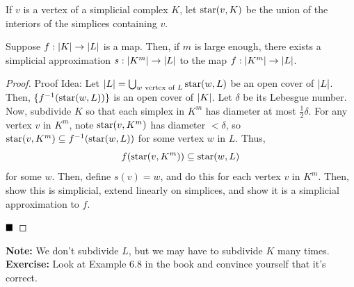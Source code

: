 \begin{definition}
    If $v$ is a vertex of a simplicial complex $K$, let $\tt{star}(v, K)$ be the union of the interiors of the simplices containing $v$.
\end{definition}

\begin{theorem}
    Suppose $f : \abs{K} \to \abs{L}$ is a map. Then, if $m$ is large enough, there exists a simplicial approximation $s : \abs{K^{m}} \to \abs{L}$ to the map $f : \abs{K^{m}} \to \abs{L}$.
\end{theorem}
\begin{proof}{Proof Idea:}
    Let $\abs{L} = \bigcup_{w \tt{ vertex of } L} \tt{star}(w, L)$ be an open cover of $\abs{L}$. Then, $\{f^{-1}(\tt{star}(w, L))\}$ is an open cover of $\abs{K}$. Let $\delta$ be its Lebesgue number.\\

    Now, subdivide $K$ so that each simplex in $K^{m}$ has diameter at most $\frac{1}{2}\delta$. For any vertex $v$ in $K^{m}$, note $\tt{star}(v, K^{m})$ has diameter $< \delta$, so $\tt{star}(v, K^{m}) \subseteq f^{-1}(\tt{star}(w, L))$ for some vertex $w$ in $L$. Thus,
    \[ f(\tt{star}(v, K^{m})) \subseteq \tt{star}(w, L) \]
    for some $w$. Then, define $s(v) = w$, and do this for each vertex $v$ in $K^{m}$. Then, show this is simplicial, extend linearly on simplices, and show it is a simplicial approximation to $f$.

    $\qed$
\end{proof}

\textbf{Note:} We don't subdivide $L$, but we may have to subdivide $K$ many times.\\

\textbf{Exercise:} Look at Example 6.8 in the book and convince yourself that it's correct.
